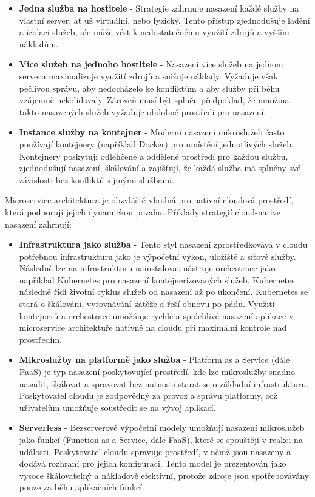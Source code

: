 \begin{itemize}
    \item \textbf{Jedna služba na hostitele} - Strategie zahrnuje nasazení každé služby na vlastní server, ať už virtuální, nebo fyzický. Tento přístup zjednodušuje ladění a izolaci služeb, ale může vést k nedostatečnému využití zdrojů a vyšším nákladům.
    \item \textbf{Více služeb na jednoho hostitele} - Nasazení více služeb na jednom serveru maximalizuje využití zdrojů a snižuje náklady. Vyžaduje však pečlivou správu, aby nedocházelo ke konfliktům a aby služby při běhu vzájemně nekolidovaly. Zároveň musí být splněn předpoklad, že množina takto nasazených služeb vyžaduje obdobné prostředí pro nasazení.
    \item \textbf{Instance služby na kontejner} - Moderní nasazení mikroslužeb často používají kontejnery (například Docker) pro umístění jednotlivých služeb. Kontejnery poskytují odlehčené a oddělené prostředí pro každou službu, zjednodušují nasazení, škálování a zajišťují, že každá služba má splněny své závislosti bez konfliktů s jinými službami.
\end{itemize}


Microservice architektura je obzvláště vhodná pro nativní cloudová prostředí, která podporují jejich dynamickou povahu. \cite{Garrison2017} Příklady strategií cloud-native nasazení zahrnují:

\begin{itemize}
    \item \textbf{Infrastruktura jako služba} - Tento styl nasazení zprostředkovává v cloudu potřebnou infrastrukturu jako je výpočetní výkon, úložiště a síťové služby. Následně lze na infrastrukturu nainstalovat nástroje orchestrace jako například Kubernetes pro nasazení kontejnerizovaných služeb. Kubernetes následně řídí životní cyklus služeb od nasazení až po ukončení. Kubernetes se stará o škálování, vyrovnávání zátěže a řeší obnovu po pádu. Využití kontejnerů a orchestrace umožňuje rychlé a spolehlivé nasazení aplikace v microservice architektuře nativně na cloudu při maximální kontrole nad prostředím.
    \item \textbf{Mikroslužby na platformě jako služba} - Platform as a Service (dále PaaS) je typ nasazení poskytovující prostředí, kde lze mikroslužby snadno nasadit, škálovat a spravovat bez nutnosti starat se o základní infrastrukturu. Poskytovatel cloudu je zodpovědný za provoz a správu platformy, což uživatelům umožňuje soustředit se na vývoj aplikací.
    \item \textbf{Serverless} - Bezserverové výpočetní modely umožňují nasazení mikroslužeb jako funkcí (Function as a Service, dále FaaS), které se spouštějí v reakci na události. Poskytovatel cloudu spravuje prostředí, v němž jsou nasazeny a dodává rozhraní pro jejich konfiguraci. Tento model je prezentován jako vysoce škálovatelný a nákladově efektivní, protože zdroje jsou spotřebovávány pouze za běhu aplikačních funkcí. 
\end{itemize}